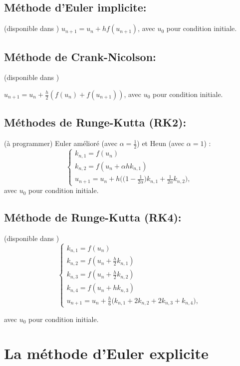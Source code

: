 \documentclass[a4paper,12pt,reqno]{amsart}
\begin{document}
\subsection*{Méthode d'Euler implicite:} (disponible dans )\newline
$ u_{n+1}=u_n+h f(u_{n+1})$, avec $u_0$ pour condition initiale.

\subsection*{Méthode de Crank-Nicolson:} (disponible dans )\newline
\smallskip
\centerline{$
u_{n+1}=u_n+\frac{h}{2}  (f(u_n)+f(u_{n+1}))$, avec $u_0$ pour condition initiale.}

\subsection*{Méthodes de Runge-Kutta (RK2):}  (à programmer)\newline
Euler amélioré (avec $\alpha = \frac{1}{2}$) et Heun (avec $\alpha=1$) :
$$
  \begin{cases}
    k_{n,1}=f(u_n)\\
    k_{n,2}=f(u_n+\alpha h k_{n,1})\\
    u_{n+1}=u_n+h \bigl( \bigl(1 - \frac{1}{2\alpha}\bigl) k_{n,1}+\frac{1}{2\alpha}k_{n,2}\bigl),
  \end{cases}
$$
avec $u_0$ pour condition initiale.

\subsection*{Méthode de Runge-Kutta (RK4):} (disponible dans )\newline
$$
  \begin{cases}
    k_{n,1}=f(u_n)\\
    k_{n,2}=f(u_n+\frac{h}{2}k_{n,1})\\[0.2cm]
    k_{n,3}=f(u_n+\frac{h}{2} k_{n,2})\\[0.2cm]
    k_{n,4}=f(u_n+h k_{n,3})\\[0.2cm]
    u_{n+1}=u_n+\frac{h}{6}\bigl( k_{n,1}+2 k_{n,2}+2 k_{n,3}+k_{n,4}\bigl),
  \end{cases}
$$

avec $u_0$ pour condition initiale.

\section{La méthode d'Euler explicite }
\end{document}
